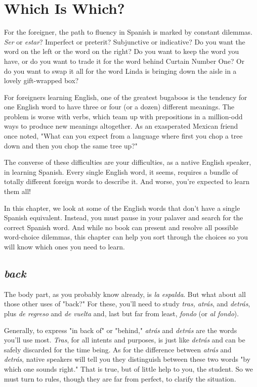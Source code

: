 \chapter{Which Is Which?}

For the foreigner, the path to fluency in Spanish is marked by
constant dilemmas. \emph{Ser} or \emph{estar}? Imperfect or preterit? Subjunctive
or indicative? Do you want the word on the left or the word on the
right? Do you want to keep the word you have, or do you want to trade
it for the word behind Curtain Number One? Or do you want to swap
it all for the word Linda is bringing down the aisle in a lovely gift-wrapped box?

For foreigners learning English, one of the greatest bugaboos
is the tendency for one English word to have three or four (or a dozen)
different meanings. The problem is worse with verbs, which team up
with prepositions in a million-odd ways to produce new meanings altogether. As an exasperated Mexican friend once noted, "What can you
expect from a language where first you chop a tree down and then you
chop the same tree up?"

The converse of these difficulties are your difficulties, as a native English speaker, in learning Spanish. Every single English word, it
seems, requires a bundle of totally different foreign words to describe
it. And worse, you're expected to learn them all!

In this chapter, we look at some of the English words that
don't have a single Spanish equivalent. Instead, you must pause in your
palaver and search for the correct Spanish word. And while no book
can present and resolve all possible word-choice dilemmas, this chapter can help you sort through the choices so you will know which ones
you need to learn.

\section{\emph{back}}

The body part, as you probably know already, is \emph{la espalda}.
But what about all those other uses of "back?" For these, you'll need
to study \emph{tras, atrás}, and \emph{detrás}, plus \emph{de regreso} and \emph{de vuelta} and, last
but far from least, \emph{fondo} (or \emph{al fondo}).

Generally, to express "in back of" or "behind," \emph{atrás} and \emph{detrás} are the words you'll use most. \emph{Tras}, for all intents and purposes, is
just like \emph{detrás} and can be safely discarded for the time being. As for
the difference between \emph{atrás} and \emph{detrás}, native speakers will tell you
they distinguish between these two words "by which one sounds right."
That is true, but of little help to you, the student. So we must turn to
rules, though they are far from perfect, to clarify the situation.

